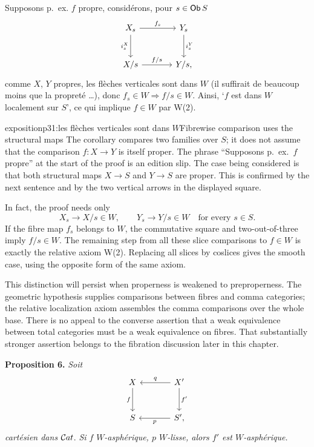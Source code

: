 \leavevmode{}Supposons p.~ex. $f$ propre, considérons, pour $s\in\mathsf{Ob}\,S$
\[
\begin{tikzcd}[row sep=large, column sep=large]
X_s \arrow[r, "f_s"] \arrow[d, "i_s^X"'] & Y_s \arrow[d, "i_s^Y"] \\
X/s \arrow[r, "f/s"] & Y/s,
\end{tikzcd}
\]
comme $X$, $Y$ propres, les flèches verticales sont dans $W$ (il suffirait de beaucoup moins que la propreté \dots), donc $f_s\in W\Longrightarrow f/s\in W$. Ainsi, `$f$ est dans $W$ localement sur $S$', ce qui implique $f\in W$ par W(2).

\begin{dcomment}{exposition}{p31:les flèches verticales sont dans $W$}{Fibrewise comparison uses the structural maps}
The corollary compares two families over $S$; it does not assume that the comparison $f:X\to Y$ is itself proper. The phrase ``Supposons p.~ex.\ $f$ propre'' at the start of the proof is an edition slip. The case being considered is that both structural maps $X\to S$ and $Y\to S$ are proper. This is confirmed by the next sentence and by the two vertical arrows in the displayed square.

In fact, the proof needs only
\[
 X_s\longrightarrow X/s\in W,
 \qquad Y_s\longrightarrow Y/s\in W
 \quad\text{for every }s\in S.
\]
If the fibre map $f_s$ belongs to $W$, the commutative square and two-out-of-three imply $f/s\in W$. The remaining step from all these slice comparisons to $f\in W$ is exactly the relative axiom W(2). Replacing all slices by coslices gives the smooth case, using the opposite form of the same axiom.

This distinction will persist when properness is weakened to preproperness. The geometric hypothesis supplies comparisons between fibres and comma categories; the relative localization axiom assembles the comma comparisons over the whole base. There is no appeal to the converse assertion that a weak equivalence between total categories must be a weak equivalence on fibres. That substantially stronger assertion belongs to the fibration discussion later in this chapter.
\end{dcomment}


\textbf{Proposition 6.} \textit{Soit}
\[
\begin{tikzcd}[row sep=large, column sep=large]
X & X' \arrow[l, "q"'] \arrow[d, "f'"] \\
S \arrow[from=u, "f"'] & S', \arrow[l, "p"]
\end{tikzcd}
\]
\textit{cartésien dans} $\mathcal{C}at$. \textit{Si $f$} \textit{$W$-asphérique, $p$ $W$-lisse, alors $f'$ est $W$-asphérique.}

